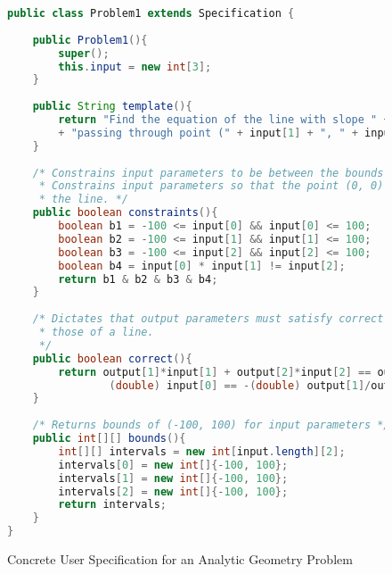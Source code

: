 \begin{singlespace}

\begin{figure}
\begin{lstlisting}[language=Java]
public class Problem1 extends Specification {
	
	public Problem1(){
		super();
		this.input = new int[3];
	}
	
	public String template(){
		return "Find the equation of the line with slope " + input[0] + " and "
		+ "passing through point (" + input[1] + ", " + input[2] + ")";
	}
	
	/* Constrains input parameters to be between the bounds -100 and 100.
	 * Constrains input parameters so that the point (0, 0) is not on
	 * the line. */
	public boolean constraints(){
		boolean b1 = -100 <= input[0] && input[0] <= 100;
		boolean b2 = -100 <= input[1] && input[1] <= 100;
		boolean b3 = -100 <= input[2] && input[2] <= 100;
		boolean b4 = input[0] * input[1] != input[2];
		return b1 & b2 & b3 & b4;
	}
	
	/* Dictates that output parameters must satisfy correct equations for
	 * those of a line. 
	 */
	public boolean correct(){
		return output[1]*input[1] + output[2]*input[2] == output[0] &&
				(double) input[0] == -(double) output[1]/output[2];
	}
	
	/* Returns bounds of (-100, 100) for input parameters */
	public int[][] bounds(){
		int[][] intervals = new int[input.length][2];
		intervals[0] = new int[]{-100, 100};
		intervals[1] = new int[]{-100, 100};
		intervals[2] = new int[]{-100, 100};
		return intervals;
	}
}
\end{lstlisting}
\caption{Concrete User Specification for an Analytic Geometry Problem}
\label{fig:problem}
\end{figure}

\end{singlespace}


